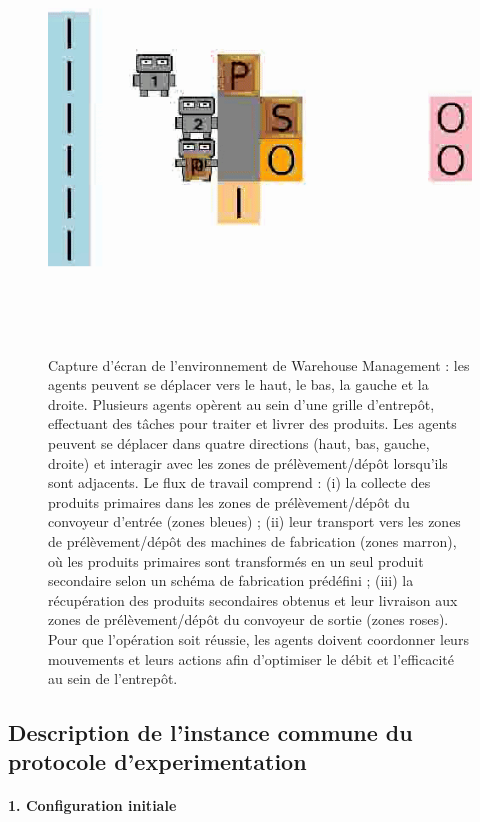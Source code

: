 \begin{figure}[h!]
  \centering
  \includegraphics[trim=0cm 3cm 0cm 3cm, clip, width=0.6\linewidth]{figures/wm.png}
  \caption{Capture d'écran de l'environnement de Warehouse Management : les agents peuvent se déplacer vers le haut, le bas, la gauche et la droite. Plusieurs agents opèrent au sein d'une grille d'entrepôt, effectuant des tâches pour traiter et livrer des produits. Les agents peuvent se déplacer dans quatre directions (haut, bas, gauche, droite) et interagir avec les zones de prélèvement/dépôt lorsqu'ils sont adjacents. Le flux de travail comprend : (i) la collecte des produits primaires dans les zones de prélèvement/dépôt du convoyeur d'entrée (zones bleues) ; (ii) leur transport vers les zones de prélèvement/dépôt des machines de fabrication (zones marron), où les produits primaires sont transformés en un seul produit secondaire selon un schéma de fabrication prédéfini ; (iii) la récupération des produits secondaires obtenus et leur livraison aux zones de prélèvement/dépôt du convoyeur de sortie (zones roses). Pour que l'opération soit réussie, les agents doivent coordonner leurs mouvements et leurs actions afin d'optimiser le débit et l'efficacité au sein de l'entrepôt.}
  \label{fig:warehouse}
\end{figure}


\subsection{Description de l'instance commune du protocole d'experimentation}

\paragraph{1. Configuration initiale}

